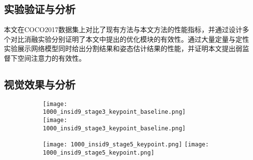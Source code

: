 \begin{outstandingabstract}
 	
	    
    \section{实验验证与分析}
	本文在COCO2017数据集上对比了现有方法与本文方法的性能指标，并通过设计多个对比消融实验分别证明了本文中提出的优化模块的有效性。通过大量定量与定性实验展示网络模型同时给出分割结果和姿态估计结果的性能，并证明本文提出弱监督下空间注意力的有效性。
    
    \subsection{视觉效果与分析}
    
    \begin{figure}[H]
    	\centering
    	\begin{minipage}{\linewidth}
    		\centering
    		\begin{subfigure}[b]{0.45\linewidth}
    			\centering
    			\begin{minipage}{\linewidth}
    				\texttt{[image: 1000\_insid9\_stage3\_keypoint\_baseline.png]}
    				{\texttt{[image: 1000\_insid9\_stage3\_keypoint\_baseline.png]}}
    			\end{minipage}
    		\end{subfigure}
    		\begin{subfigure}[b]{0.45\linewidth}
    			\centering
    			\begin{minipage}{\linewidth}
    				\texttt{[image: 1000\_insid9\_stage5\_keypoint.png]}
    				{\texttt{[image: 1000\_insid9\_stage5\_keypoint.png]}}
    			\end{minipage}
    		\end{subfigure}
    		

\end{minipage}
\end{figure}
\end{outstandingabstract}
